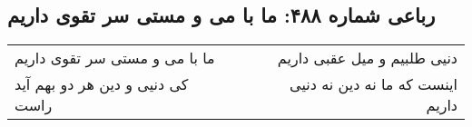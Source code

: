 \begin{center}
\section*{رباعی شماره ۴۸۸: ما با می و مستی سر تقوی داریم}
\label{sec:sh488}
\begin{longtable}{l p{0.5cm} r}
ما با می و مستی سر تقوی داریم
&&
دنیی طلبیم و میل عقبی داریم
\\
کی دنیی و دین هر دو بهم آید راست
&&
اینست که ما نه دین نه دنیی داریم
\\
\end{longtable}
\end{center}
